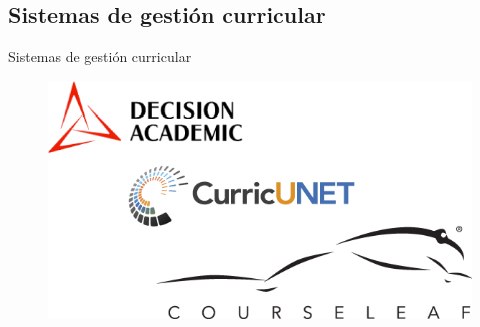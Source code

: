 \documentclass[10pt,xcolor=table]{beamer}
\begin{document}
\subsection{Sistemas de gestión curricular}
\begin{frame}{Sistemas de gestión curricular}
	\begin{figure}
		\centering
	    \includegraphics[scale=0.5]{../Figuras/cms_alternatives}
	\end{figure}
\end{frame}
\end{document}
